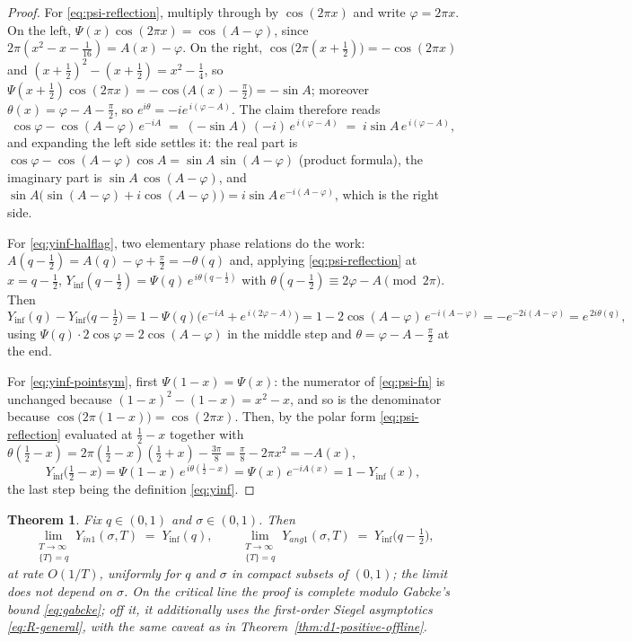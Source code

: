 \documentclass[11pt]{article}
\newtheorem{theorem}{Theorem}[section]
\theoremstyle{definition}
\begin{document}
\begin{proof}
For \eqref{eq:psi-reflection}, multiply through by $\cos(2\pi x)$ and write
$\varphi=2\pi x$. On the left, $\Psi(x)\cos(2\pi x)=\cos(A-\varphi)$, since
$2\pi(x^{2}-x-\tfrac1{16})=A(x)-\varphi$. On the right,
$\cos\bigl(2\pi(x+\tfrac12)\bigr)=-\cos(2\pi x)$ and
$(x+\tfrac12)^{2}-(x+\tfrac12)=x^{2}-\tfrac14$, so
$\Psi(x+\tfrac12)\cos(2\pi x)=-\cos\bigl(A(x)-\tfrac\pi2\bigr)=-\sin A$;
moreover $\theta(x)=\varphi-A-\tfrac\pi2$, so
$e^{i\theta}=-ie^{\,i(\varphi-A)}$. The claim therefore reads
\[
\cos\varphi-\cos(A-\varphi)\,e^{-iA}
\;=\;(-\sin A)\,(-i)\,e^{\,i(\varphi-A)}
\;=\;i\sin A\,e^{\,i(\varphi-A)},
\]
and expanding the left side settles it: the real part is
$\cos\varphi-\cos(A-\varphi)\cos A=\sin A\,\sin(A-\varphi)$ (product
formula), the imaginary part is $\sin A\,\cos(A-\varphi)$, and
$\sin A\bigl(\sin(A-\varphi)+i\cos(A-\varphi)\bigr)
=i\sin A\,e^{-i(A-\varphi)}$, which is the right side.

For \eqref{eq:yinf-halflag}, two elementary phase relations do the work:
$A(q-\tfrac12)=A(q)-\varphi+\tfrac\pi2=-\theta(q)$ and, applying
\eqref{eq:psi-reflection} at $x=q-\tfrac12$,
$Y_{\inf}(q-\tfrac12)=\Psi(q)\,e^{\,i\theta(q-\frac12)}$ with
$\theta(q-\tfrac12)\equiv2\varphi-A\pmod{2\pi}$. Then
\[
Y_{\inf}(q)-Y_{\inf}\bigl(q-\tfrac12\bigr)
=1-\Psi(q)\bigl(e^{-iA}+e^{\,i(2\varphi-A)}\bigr)
=1-2\cos(A-\varphi)\,e^{-i(A-\varphi)}
=-e^{-2i(A-\varphi)}
=e^{\,2i\theta(q)},
\]
using $\Psi(q)\cdot2\cos\varphi=2\cos(A-\varphi)$ in the middle step and
$\theta=\varphi-A-\tfrac\pi2$ at the end.

For \eqref{eq:yinf-pointsym}, first $\Psi(1-x)=\Psi(x)$: the numerator of
\eqref{eq:psi-fn} is unchanged because $(1-x)^{2}-(1-x)=x^{2}-x$, and so is
the denominator because $\cos\bigl(2\pi(1-x)\bigr)=\cos(2\pi x)$. Then, by
the polar form \eqref{eq:psi-reflection} evaluated at $\tfrac12-x$
together with
$\theta(\tfrac12-x)=2\pi(\tfrac12-x)(\tfrac12+x)-\tfrac{3\pi}8
=\tfrac\pi8-2\pi x^{2}=-A(x)$,
\[
Y_{\inf}\bigl(\tfrac12-x\bigr)
=\Psi(1-x)\,e^{\,i\theta(\frac12-x)}
=\Psi(x)\,e^{-iA(x)}
=1-Y_{\inf}(x),
\]
the last step being the definition \eqref{eq:yinf}.
\end{proof}

\begin{theorem}\label{thm:yinf}
Fix $q\in(0,1)$ and $\sigma\in(0,1)$. Then
\[
\lim_{\substack{T\to\infty\\ \{T\}=q}} Y_{in1}(\sigma,T)\;=\;Y_{\inf}(q),
\qquad
\lim_{\substack{T\to\infty\\ \{T\}=q}} Y_{ang1}(\sigma,T)
\;=\;Y_{\inf}\bigl(q-\tfrac12\bigr),
\]
at rate $O(1/T)$, uniformly for $q$ and $\sigma$ in compact subsets of
$(0,1)$; the limit does not depend on $\sigma$. On the critical line the
proof is complete modulo Gabcke's bound \eqref{eq:gabcke}; off it, it
additionally uses the first-order Siegel asymptotics \eqref{eq:R-general},
with the same caveat as in Theorem~\ref{thm:d1-positive-offline}.
\end{theorem}
\end{document}
